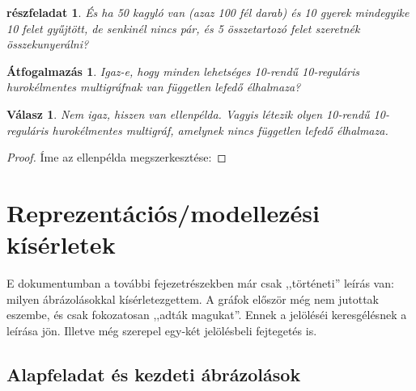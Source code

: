 \documentclass{article}
\newcommand{\she}[1]{\ensuremath{\Strichmaxerl_{#1}}}
\newcommand{\oys}[1]{\ensuremath{(\!|\!)_{#1}}}
\newcommand{\incidsymbol}{\bullet\!\!\!\checkmark}
\newtheorem{subproblem}{részfeladat}
\newtheorem*{reword}{Átfogalmazás}
\newtheorem*{answer}{Válasz}
\begin{document}
	\begin{subproblem}
		És ha 50 kagyló van (azaz 100 fél darab) és 10 gyerek mindegyike 10 felet gyűjtött, de senkinél nincs pár, és 5 összetartozó felet szeretnék összekunyerálni?
	\end{subproblem}
	\begin{reword}
		Igaz-e, hogy minden lehetséges 10-rendű 10-reguláris hurokélmentes multigráfnak van független lefedő élhalmaza?
	\end{reword}
	\begin{answer}
		Nem igaz, hiszen van ellenpélda. Vagyis létezik olyen 10-rendű 10-reguláris hurokélmentes multigráf, amelynek nincs független lefedő élhalmaza.
	\end{answer}
	\begin{proof}
		Íme az ellenpélda megszerkesztése:

		
	\end{proof}
	
	\begin{comment}
		$\mathfrak G = \left\langle \mathcal V, \mathcal E, \incidsymbol\right\rangle\,\,\,\,\,\,(\incidsymbol \in \mathcal V \times \mathcal E)$, ahol
		\begin{itemize}
			\item $\mathcal V = \left\lbrace\,\she1, \she2, \she3, \she4, \she5, \she6 \,\right\rbrace$ (gyerekek mint a gráf csúcsai)
			\item $\mathcal E = \left\lbrace\,\oys{1,2}^1, \oys{1,2}^2, \oys{1,2}^3, \oys{1,2}^4, \oys{1,2}^5, \oys{2,3}^1, \oys{2,3}^2, \oys{2,3}^3, \oys{2,3}^4, \oys{2,3}^5, \oys{3,1}^1, \oys{3,1}^2, \oys{3,1}^3, \oys{3,1}^4, \oys{3,1}^5 \,\right\rbrace$ (kagylók mint a gráf élei)
		\end{itemize}
	\end{comment}
	

	\section{Reprezentációs/modellezési kísérletek}

	E dokumentumban a további fejezetrészekben már csak ,,történeti'' leírás van: milyen ábrázolásokkal kísérletezgettem. A gráfok először még nem jutottak eszembe, és csak fokozatosan ,,adták magukat''. Ennek a jelöléséi keresgélésnek a leírása jön. Illetve még szerepel egy-két jelölésbeli fejtegetés is.

	\subsection{Alapfeladat és kezdeti ábrázolások}
\end{document}
